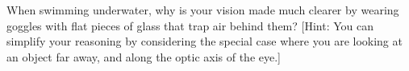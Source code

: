 When swimming underwater, why is your vision made much
clearer by wearing goggles with flat pieces of glass that
trap air behind them? [Hint: You can simplify your reasoning
by considering the special case where you are looking at an
object far away, and along the optic axis of the eye.]
